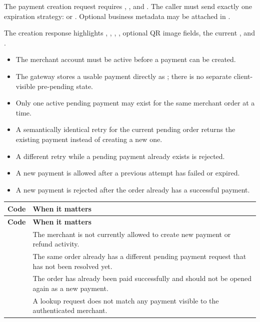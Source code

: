 The payment creation request requires , , and
. The caller must send exactly one expiration strategy:
 or . Optional business metadata may be
attached in .

The creation response highlights , ,
, , optional QR image fields, the current
, and .

\begin{itemize}
  \item The merchant account must be active before a payment can be created.
  \item The gateway stores a usable payment directly as ; there is
  no separate client-visible pre-pending state.
  \item Only one active pending payment may exist for the same merchant order
  at a time.
  \item A semantically identical retry for the current pending order returns
  the existing payment instead of creating a new one.
  \item A different retry while a pending payment already exists is rejected.
  \item A new payment is allowed after a previous attempt has failed or
  expired.
  \item A new payment is rejected after the order already has a successful
  payment.
\end{itemize}

\begin{longtable}{@{}L{0.28\textwidth}L{0.62\textwidth}@{}}
\toprule
\textbf{Code} & \textbf{When it matters} \\
\midrule
\endfirsthead
\toprule
\textbf{Code} & \textbf{When it matters} \\
\midrule
\endhead
{} & The merchant is not currently allowed to create
new payment or refund activity. \\
\bodyrowrule
{} & The same order already has a different pending
payment request that has not been resolved yet. \\
\bodyrowrule
{} & The order has already been paid successfully
and should not be opened again as a new payment. \\
\bodyrowrule
{} & A lookup request does not match any payment visible
to the authenticated merchant. \\
\bottomrule
\end{longtable}

